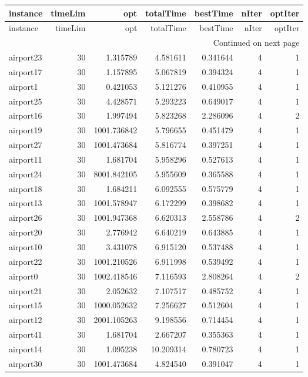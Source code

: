 
\begin{longtable}{|l|r|r|r|r|r|r|}
\toprule
instance & timeLim & opt & totalTime & bestTime & nIter & optIter \\
\midrule
\endfirsthead
\toprule
instance & timeLim & opt & totalTime & bestTime & nIter & optIter \\
\midrule
\endhead
\midrule
\multicolumn{7}{r}{Continued on next page} \\
\midrule
\endfoot
\bottomrule
\endlastfoot
airport23 & 30 & 1.315789 & 4.581611 & 0.341644 & 4 & 1 \\
airport17 & 30 & 1.157895 & 5.067819 & 0.394324 & 4 & 1 \\
airport1 & 30 & 0.421053 & 5.121276 & 0.410955 & 4 & 1 \\
airport25 & 30 & 4.428571 & 5.293223 & 0.649017 & 4 & 1 \\
airport16 & 30 & 1.997494 & 5.823268 & 2.286096 & 4 & 2 \\
airport19 & 30 & 1001.736842 & 5.796655 & 0.451479 & 4 & 1 \\
airport27 & 30 & 1001.473684 & 5.816774 & 0.397251 & 4 & 1 \\
airport11 & 30 & 1.681704 & 5.958296 & 0.527613 & 4 & 1 \\
airport24 & 30 & 8001.842105 & 5.955609 & 0.365588 & 4 & 1 \\
airport18 & 30 & 1.684211 & 6.092555 & 0.575779 & 4 & 1 \\
airport13 & 30 & 1001.578947 & 6.172299 & 0.398682 & 4 & 1 \\
airport26 & 30 & 1001.947368 & 6.620313 & 2.558786 & 4 & 2 \\
airport20 & 30 & 2.776942 & 6.640219 & 0.643885 & 4 & 1 \\
airport10 & 30 & 3.431078 & 6.915120 & 0.537488 & 4 & 1 \\
airport22 & 30 & 1001.210526 & 6.911998 & 0.539492 & 4 & 1 \\
airport0 & 30 & 1002.418546 & 7.116593 & 2.808264 & 4 & 2 \\
airport21 & 30 & 2.052632 & 7.107517 & 0.485752 & 4 & 1 \\
airport15 & 30 & 1000.052632 & 7.256627 & 0.512604 & 4 & 1 \\
airport12 & 30 & 2001.105263 & 9.198556 & 0.714454 & 4 & 1 \\
airport41 & 30 & 1.681704 & 2.667207 & 0.355363 & 4 & 1 \\
airport14 & 30 & 1.095238 & 10.209314 & 0.780723 & 4 & 1 \\
airport30 & 30 & 1001.473684 & 4.824540 & 0.391047 & 4 & 1 \\

\end{longtable}
